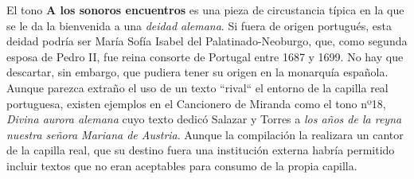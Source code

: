 El tono \textbf{A los sonoros encuentros} es una pieza de circustancia típica en la que se le da la bienvenida a una \textit{deidad alemana}. Si fuera de origen portugués, esta deidad podría ser María Sofía Isabel del Palatinado-Neoburgo, que, como segunda esposa de Pedro II, fue reina consorte de Portugal entre 1687 y 1699. No hay que descartar, sin embargo, que pudiera tener su origen en la monarquía española. Aunque parezca extraño el uso de un texto ``rival`` el entorno de la capilla real portuguesa, existen ejemplos en el Cancionero de Miranda como el tono nº18, \textit{Divina aurora alemana} cuyo texto dedicó Salazar y Torres a \textit{los años de la reyna nuestra señora Mariana de Austria}. Aunque la compilación la realizara un cantor de la capilla real, que su destino fuera una institución externa habría permitido incluir textos que no eran aceptables para consumo de la propia capilla.
